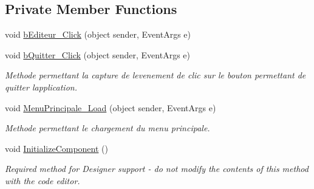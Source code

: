 \subsection*{Private Member Functions}
\begin{DoxyCompactItemize}
\item 
void \hyperlink{group__inf2990_ga554182f2afe766c98e448291f5e54be1}{b\+Editeur\+\_\+\+Click} (object sender, Event\+Args e)
\item 
void \hyperlink{group__inf2990_gabb7f05cd5ff4348a2c40f01793098cf4}{b\+Quitter\+\_\+\+Click} (object sender, Event\+Args e)
\begin{DoxyCompactList}\small\item\em Methode permettant la capture de l\textquotesingle{}evenement de clic sur le bouton permettant de quitter l\textquotesingle{}application. \end{DoxyCompactList}\item 
void \hyperlink{group__inf2990_ga1d619bca8cc91924878c4a5c402b4f79}{Menu\+Principale\+\_\+\+Load} (object sender, Event\+Args e)
\begin{DoxyCompactList}\small\item\em Methode permettant le chargement du menu principale. \end{DoxyCompactList}\item 
void \hyperlink{class_interface_graphique_1_1_menu_principale_a7ef09533d65c974d720a58bcf1313ea1}{Initialize\+Component} ()
\begin{DoxyCompactList}\small\item\em Required method for Designer support -\/ do not modify the contents of this method with the code editor. \end{DoxyCompactList}\end{DoxyCompactItemize}
